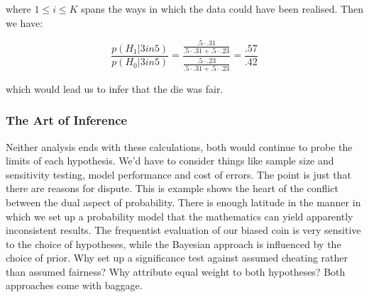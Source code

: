 \documentclass[10pt,a4paper,notitlepage, twocolumn]{article}
\begin{document}
where $ 1 \leq i \leq K$ spans the ways in which the data could have been realised. Then we have:

$$ \frac{p(H_1 | 3 in 5)}{p(H_{0} | 3 in 5)} = \frac{\frac{.5\cdot .31}{.5\cdot .31 + .5 \cdot .23}}{\frac{.5\cdot .23}{.5\cdot .31 + .5 \cdot .23}} = \frac{.57}{.42} $$

which would lead us to infer that the die was fair. 

\subsubsection*{The Art of Inference}
Neither analysis ends with these calculations, both would continue to probe the limits of each hypothesis. We'd have to consider things like sample size and sensitivity testing, model performance and cost of errors. The point is just that there are reasons for dispute. This is example shows the heart of the conflict between the dual aspect of probability. There is enough latitude in the manner in which we set up a probability model that the mathematics can yield apparently inconsistent results. The frequentist evaluation of our biased coin is very sensitive to the choice of hypotheses, while the Bayesian approach is influenced by the choice of prior. Why set up a significance test against assumed cheating rather than assumed fairness? Why attribute equal weight to both hypotheses? Both approaches come with baggage. 
\end{document}
